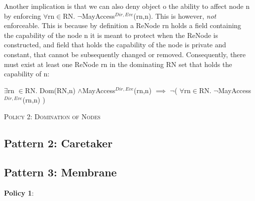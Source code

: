 \documentclass[a4paper,11pt, twoside,twocolumn]{article}
\newenvironment{logic}[1][null]
{\begin{flushleft} \small \label{#1}}
{\end{flushleft}}
\newcommand{\loin}{$\in$}
\newcommand{\loforall}{$\forall$}
\newcommand{\loexists}{$\exists$}
\newcommand{\loand}{$\land$}
\newcommand{\loimplies}{$\implies$}
\newcommand{\loneg}{$\neg$}
\newcommand{\ablock} {\null\qquad}
\begin{document}
Another implication is that we can also deny object o the ability to affect node n by enforcing \loforall rn\loin RN. \loneg MayAccess$^{Dir,Eve}$(rn,n). This is however, \textit{not} enforceable. This is because by definition a ReNode rn holds a field containing the capability of the node n it is meant to protect when the ReNode is constructed, and field that holds the capability of the node is private and constant, that cannot be subsequently changed or removed. Consequently, there must exist at least one ReNode rn in the dominating RN set that holds the capability of n:
\begin{logic}[NodeP1c]
\loexists rn \loin RN. Dom(RN,n) \loand MayAccess$^{Dir,Eve}$(rn,n)\linebreak
\ablock \loimplies \linebreak
\ablock \loneg( \loforall rn\loin RN. \loneg MayAccess$^{Dir,Eve}$(rn,n) )
\end{logic}

\textsc{Policy 2: Domination of Nodes}
\begin{logic}[NodeP2]
\end{logic}



\subsection{Pattern 2: Caretaker}
\subsection{Pattern 3: Membrane}




\textbf{Policy 1}:




\small



\end{document}
